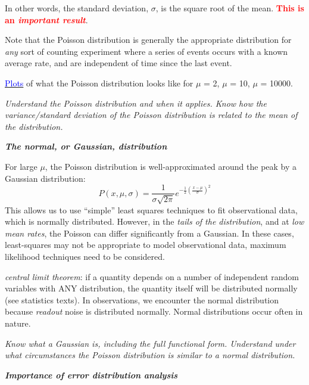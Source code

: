 \documentclass[12pt]{article}
\begin{document}
In other words, the standard deviation, $\sigma$, is the square root
of the mean.
\textcolor{red}{\textbf{This is an \emph{important result}}}.

Note that the Poisson distribution is generally the
appropriate distribution for \emph{any} sort of counting experiment
where a series of events occurs with a known average rate,
and are independent of time since the last event.

\href{http://astronomy.nmsu.edu/holtz/a535/html/diagrams/a535/poisson.htm}
{\textcolor{blue}{Plots}} of what the Poisson distribution looks like
for $\mu$ = 2, $\mu$ = 10, $\mu$ = 10000.

\textcolor{om}{\emph{Understand the Poisson distribution and when it
applies. Know how the variance/standard deviation of the Poisson
distribution is related to the mean of the distribution.}}

\textbf{\emph{The normal, or Gaussian, distribution}}

For large $\mu$, the Poisson distribution is
well-approximated around the peak by a Gaussian distribution:
    $$ P(x,\mu,\sigma) = \frac{1}{\sigma\sqrt{2\pi}}
        e^{ -\frac{1}{2} (\frac{x-\mu}{\sigma})^2 }  $$
This allows us to use ``simple'' least squares
techniques to fit observational data, which is normally distributed.
However, in the \emph{tails of the distribution},
and at \emph{low mean rates}, the Poisson can
differ significantly from a Gaussian. In these cases,
least-squares may not be appropriate to model observational data,
maximum likelihood techniques need to be considered.

\emph{central limit theorem}: if a quantity
depends on a number of independent random variables with ANY
distribution, the quantity itself will be distributed normally (see
statistics texts). In observations, we encounter the normal
distribution because \emph{readout} noise is distributed normally.
Normal distributions occur often in nature.

\textcolor{om}{\emph{Know what a Gaussian is, including the full
functional form. Understand under what circumstances the Poisson
distribution is similar to a normal distribution.}}

\textbf{\emph{Importance of error distribution analysis}}
\end{document}
